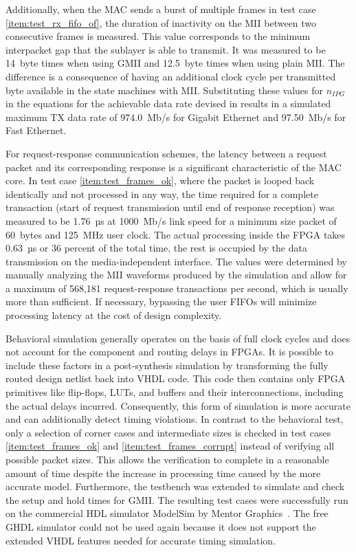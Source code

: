 \documentclass[a4paper, 11pt, oneside]{Thesis}  %
\begin{document}
Additionally, when the MAC sends a burst of multiple frames in test case \ref{item:test_rx_fifo_of}, the duration of inactivity on the MII between two consecutive frames is measured. This value corresponds to the minimum interpacket gap that the sublayer is able to transmit. It was measured to be 14~byte times when using GMII and 12.5~byte times when using plain MII. The difference is a consequence of having an additional clock cycle per transmitted byte available in the state machines with MII. Substituting these values for $n_{IPG}$ in the equations for the achievable data rate devised in  results in a simulated maximum TX data rate of 974.0~Mb/s for Gigabit Ethernet and 97.50~Mb/s for Fast Ethernet.

For request-response communication schemes, the latency between a request packet and its corresponding response is a significant characteristic of the MAC core. In test case \ref{item:test_frames_ok}, where the packet is looped back identically and not processed in any way, the time required for a complete transaction (start of request transmission until end of response reception) was measured to be 1.76~µs at 1000~Mb/s link speed for a minimum size packet of 60~bytes and 125~MHz user clock. The actual processing inside the FPGA takes 0.63~µs or 36 percent of the total time, the rest is occupied by the data transmission on the media-independent interface. The values were determined by manually analyzing the MII waveforms produced by the simulation and allow for a maximum of 568,181 request-response transactions per second, which is usually more than sufficient. If necessary, bypassing the user FIFOs will minimize processing latency at the cost of design complexity.

Behavioral simulation generally operates on the basis of full clock cycles and does not account for the component and routing delays in FPGAs. It is possible to include these factors in a post-synthesis simulation by transforming the fully routed design netlist back into VHDL code. This code then contains only FPGA primitives like flip-flops, LUTs, and buffers and their interconnections, including the actual delays incurred. Consequently, this form of simulation is more accurate and can additionally detect timing violations. In contrast to the behavioral test, only a selection of corner cases and intermediate sizes is checked in test cases \ref{item:test_frames_ok} and \ref{item:test_frames_corrupt} instead of verifying all possible packet sizes. This allows the verification to complete in a reasonable amount of time despite the increase in processing time caused by the more accurate model. Furthermore, the testbench was extended to simulate and check the setup and hold times for GMII. The resulting test cases were successfully run on the commercial HDL simulator ModelSim by Mentor Graphics~\cite{ModelSim}. The free GHDL simulator could not be used again because it does not support the extended VHDL features needed for accurate timing simulation.
\end{document}
